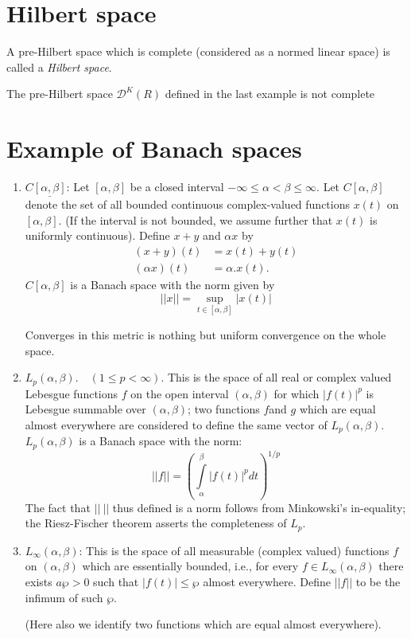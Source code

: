 \section{Hilbert space}\label{chap1:sec6}

\begin{defi*}%
 A pre-Hilbert space which is complete (considered as a normed linear
 space) is called a \textit{Hilbert space}. 
\end{defi*}

The pre-Hilbert space $\mathscr{D}^K (R)$ defined in the last example
is not complete 

\section{Example of Banach spaces}\label{chap1:sec7}

\begin{enumerate}[1)]
\item $C \underline{[\alpha, \beta]}$: Let $[\alpha, \beta]$ be
 a closed interval $- \infty \le \alpha < \beta \le \infty$. Let
 $C[\alpha, \beta]$ denote the set of all bounded continuous
 complex-valued functions $x(t)$ on $[\alpha, \beta]$. (If the
 interval is not bounded, we assume further that $x(t)$ is uniformly
 continuous). Define $x + y$ and $\alpha x$ by 
 \begin{align*}
  (x + y) (t) & = x(t) + y(t)\\
  (\alpha x) (t) & = \alpha. x(t).
 \end{align*}
 $C[\alpha, \beta]$ is a Banach space with the norm given by
 $$
 || x || = \sup_{t \in [ \alpha, \beta]} |x(t) |
 $$

 Converges in this metric is nothing but uniform convergence on the
 whole space. 
\item $L_p (\alpha, \beta). \quad (1 \le p < \infty)$. This is the
 space of all real or complex valued Lebesgue functions $f$ on the
 open interval $(\alpha, \beta)$ for which $|f(t)|^p$ is Lebesgue
 summable over $(\alpha, \beta)$; two functions $f$\pageoriginale and $g$ which
 are equal almost everywhere are considered to define the same vector
 of $L_p (\alpha, \beta)$. $L_p (\alpha, \beta)$ is a Banach space
 with the norm: 
 $$
 || f || = \left( \int\limits_\alpha^\beta |f(t)|^p dt \right)^{1/p}
 $$
 The fact that $|| ~ ||$ thus defined is a norm follows from
 Minkowski's in-equality; the Riesz-Fischer theorem asserts the
 completeness of $L_p$. 
\item $L_\infty (\alpha, \beta)$: This is the space of all measurable
 (complex valued) functions $f$ on $(\alpha, \beta)$ which are
 essentially bounded, i.e., for every $f \in L_\infty (\alpha,
 \beta)$ there exists $a \wp > 0$ such that $| f(t) | \le \wp$ almost
 everywhere. Define $|| f ||$ to be the infimum of such $\wp$. 
 
 (Here also we identify two functions which are equal almost everywhere).
\end{enumerate}

